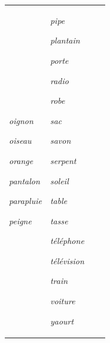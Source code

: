 \documentclass[output=paper,newtxmath,modfonts,nonflat,draftmode]{langsci/langscibook}
\begin{document}
\begin{table}
\begin{tabularx}{\textwidth}{XXXX}
\textit{oignon}

\textit{oiseau}

\textit{orange}

\textit{pantalon}

\textit{parapluie}

\textit{peigne} & \textit{pipe}

\textit{plantain~}

\textit{porte}

\textit{radio}

\textit{robe}

\textit{sac}

\textit{savon}

\textit{serpent}

\textit{soleil}

\textit{table}

\textit{tasse}

\textit{téléphone}

\textit{télévision}

\textit{train}

\textit{voiture}

\textit{yaourt}\\
\end{tabularx}
\end{table}
\end{document}
